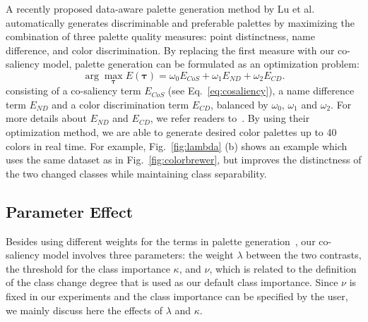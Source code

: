 


A recently proposed data-aware palette generation method by Lu et al.~\cite{Lu21} automatically generates discriminable and preferable palettes by maximizing the combination of three palette quality measures: point distinctness, name difference, and color discrimination.
By replacing the first measure with our co-saliency model, palette generation can be formulated as an optimization problem:
\begin{equation}
\arg\max_{\mathbf{\tau}} E(\mathbf{\tau}) = \omega_0 E_{CoS} + \omega_1 E_{ND} + \omega_2 E_{CD}.
\label{eq:energyfunc}
\end{equation}
consisting of a co-saliency term $E_{CoS}$ (see Eq.~\ref{eq:cosaliency}), a name difference term $E_{ND}$ and a color discrimination term $E_{CD}$, balanced by $\omega_0$, $\omega_1$ and $\omega_2$. For more details about $E_{ND}$ and $E_{CD}$, we refer readers to~\cite{Lu21}. By using their optimization method, we are able to generate desired color palettes up to 40 colors in real time. %
For example, Fig.~\ref{fig:lambda} (b) shows an example which uses the same dataset as in Fig.~\ref{fig:colorbrewer}, but improves the distinctness of the two changed classes while maintaining class separability.



\subsection{Parameter Effect}
\label{subsec:parameter}
Besides using different weights for the terms in palette generation~\cite{Lu21}, our co-saliency model involves three parameters: the weight $\lambda$ between the two contrasts, the threshold for the class importance $\kappa$, and $\nu$, which is related to the definition of the class change degree that is used as our default class importance.
Since $\nu$ is fixed in our experiments and the class importance can be specified by the user, we mainly discuss here the effects of $\lambda$  and $\kappa$.

